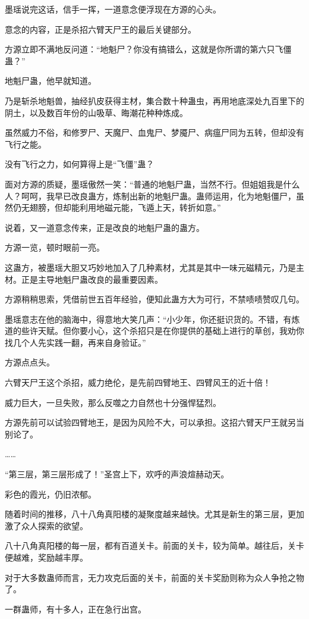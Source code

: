 \begin{this_body}
墨瑶说完这话，信手一挥，一道意念便浮现在方源的心头。

意念的内容，正是杀招六臂天尸王的最后关键部分。

方源立即不满地反问道：“地魁尸？你没有搞错么，这就是你所谓的第六只飞僵蛊？”

地魁尸蛊，他早就知道。

乃是斩杀地魁兽，抽经扒皮获得主材，集合数十种蛊虫，再用地底深处九百里下的阴土，以及数百年份的山吸草、晦潮花种种炼成。

虽然威力不俗，和修罗尸、天魔尸、血鬼尸、梦魇尸、病瘟尸同为五转，但却没有飞行之能。

没有飞行之力，如何算得上是“飞僵”蛊？

面对方源的质疑，墨瑶傲然一笑：“普通的地魁尸蛊，当然不行。但姐姐我是什么人？呵呵，我早已改良蛊方，炼制出新的地魁尸蛊。蛊师运用，化为地魁僵尸，虽然仍无翅膀，但却能利用地磁元能，飞遁上天，转折如意。”

说着，又一道意念传来，正是改良的地魁尸蛊的蛊方。

方源一览，顿时眼前一亮。

这蛊方，被墨瑶大胆又巧妙地加入了几种素材，尤其是其中一味元磁精元，乃是主材。正是主导地魁尸蛊改良的最重要因素。

方源稍稍思索，凭借前世五百年经验，便知此蛊方大为可行，不禁啧啧赞叹几句。

墨瑶意志在他的脑海中，得意地大笑几声：“小少年，你还挺识货的。不错，有炼道的些许天赋。但你要小心，这个杀招只是在你提供的基础上进行的草创，我劝你找几个人先实践一翻，再来自身验证。”

方源点点头。

六臂天尸王这个杀招，威力绝伦，是先前四臂地王、四臂风王的近十倍！

威力巨大，一旦失败，那么反噬之力自然也十分强悍猛烈。

方源先前可以试验四臂地王，是因为风险不大，可以承担。这招六臂天尸王就另当别论了。

……

“第三层，第三层形成了！”圣宫上下，欢呼的声浪煊赫动天。

彩色的霞光，仍旧浓郁。

随着时间的推移，八十八角真阳楼的凝聚度越来越快。尤其是新生的第三层，更加激了众人探索的欲望。

八十八角真阳楼的每一层，都有百道关卡。前面的关卡，较为简单。越往后，关卡便越难，奖励越丰厚。

对于大多数蛊师而言，无力攻克后面的关卡，前面的关卡奖励则称为众人争抢之物了。

一群蛊师，有十多人，正在急行出宫。


\end{this_body}
